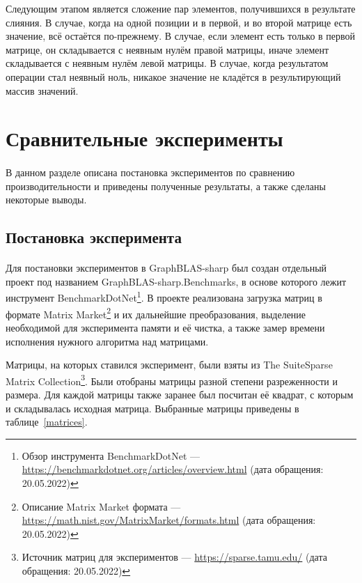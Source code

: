 \documentclass[14pt]{matmex-diploma-custom}
\begin{document}
Следующим этапом является сложение пар элементов, получившихся в результате слияния. В случае, когда на одной позиции и в первой, и во второй матрице есть значение, всё остаётся по-прежнему. В случае, если элемент есть только в первой матрице, он складывается с неявным нулём правой матрицы, иначе элемент складывается с неявным нулём левой матрицы. В случае, когда результатом операции стал неявный ноль, никакое значение не кладётся в результирующий массив значений.

\section{Сравнительные эксперименты}
\paragraph{}В данном разделе описана постановка экспериментов по сравнению производительности и приведены полученные результаты, а также сделаны некоторые выводы.

\subsection{Постановка эксперимента}
\paragraph{}Для постановки экспериментов в GraphBLAS-sharp был создан отдельный проект под названием GraphBLAS-sharp.Benchmarks, в основе которого лежит инструмент BenchmarkDotNet\footnote{Обзор инструмента BenchmarkDotNet --- \url{https://benchmarkdotnet.org/articles/overview.html} (дата обращения: 20.05.2022)}. В проекте реализована загрузка матриц в формате Matrix Market\footnote{Описание Matrix Market  формата --- \url{https://math.nist.gov/MatrixMarket/formats.html} (дата обращения: 20.05.2022)} и их дальнейшие преобразования, выделение необходимой для эксперимента памяти и её чистка, а также замер времени исполнения нужного алгоритма над матрицами.

Матрицы, на которых ставился эксперимент, были взяты из The SuiteSparse Matrix Collection\footnote{Источник матриц для экспериментов --- \url{https://sparse.tamu.edu/} (дата обращения: 20.05.2022)}. Были отобраны матрицы разной степени разреженности и размера. Для каждой матрицы также заранее был посчитан её квадрат, с которым и складывалась исходная матрица. Выбранные матрицы приведены в таблице~\ref{matrices}.
\end{document}
